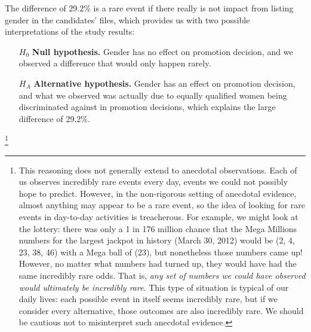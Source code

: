 The difference of 29.2\% is a rare event if there really is not impact from listing gender in the candidates' files, which provides us with two possible interpretations of the study results:
\begin{itemize}
\setlength{\itemsep}{0mm}
\item[$H_0$] \textbf{Null hypothesis.} Gender has no effect on promotion decision, and we observed a difference that would only happen rarely.
\item[$H_A$] \textbf{Alternative hypothesis.} Gender has an effect on promotion decision, and what we observed was actually due to equally qualified women being discriminated against in promotion decisions, which explains the large difference of 29.2\%.
\end{itemize}
\footnote{This reasoning does not generally extend to anecdotal observations. Each of us observes incredibly rare events every day, events we could not possibly hope to predict. However, in the non-rigorous setting of anecdotal evidence, almost anything may appear to be a rare event, so the idea of looking for rare events in day-to-day activities is treacherous. For example, we might look at the lottery: there was only a 1 in 176 million chance that the Mega Millions numbers for the largest jackpot in history (March 30, 2012) would be (2, 4, 23, 38, 46) with a Mega ball of (23), but nonetheless those numbers came up! However, no matter what numbers had turned up, they would have had the same incredibly rare odds. That is, \emph{any set of numbers we could have observed would ultimately be incredibly rare}. This type of situation is typical of our daily lives: each possible event in itself seems incredibly rare, but if we consider every alternative, those outcomes are also incredibly rare. We should be cautious not to misinterpret such anecdotal evidence.} 


